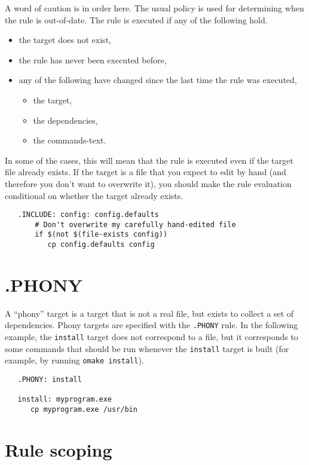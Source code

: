 A word of caution is in order here.  The usual policy is used for determining when the rule is
out-of-date.  The rule is executed if any of the following hold.

\begin{itemize}
\item the target does not exist,
\item the rule has never been executed before,
\item any of the following have changed since the last time the rule was executed,
\begin{itemize}
\item the target,
\item the dependencies,
\item the commands-text.
\end{itemize}
\end{itemize}

In some of the cases, this will mean that the rule is executed even if the target file already
exists.  If the target is a file that you expect to edit by hand (and therefore you don't want to
overwrite it), you should make the rule evaluation conditional on whether the target already exists.

\begin{verbatim}
   .INCLUDE: config: config.defaults
       # Don't overwrite my carefully hand-edited file
       if $(not $(file-exists config))
          cp config.defaults config
\end{verbatim}

\section{.PHONY}

A ``phony'' target is a target that is not a real file, but exists to collect a set of dependencies.
Phony targets are specified with the \verb+.PHONY+ rule.  In the following example, the
\verb+install+ target does not correspond to a file, but it corresponds to some commands that should
be run whenever the \verb+install+ target is built (for example, by running \verb+omake install+).

\begin{verbatim}
   .PHONY: install

   install: myprogram.exe
      cp myprogram.exe /usr/bin
\end{verbatim}

\section{Rule scoping}

